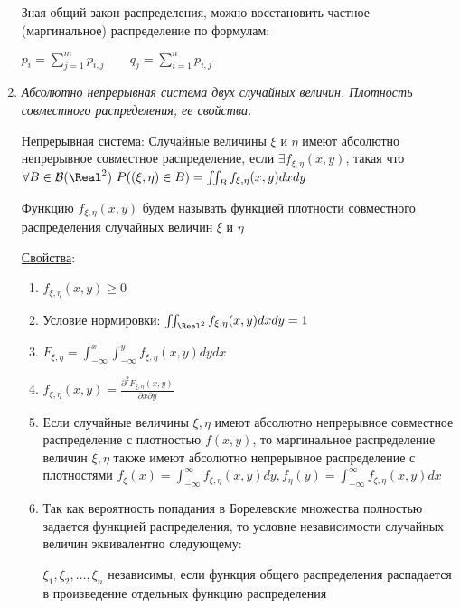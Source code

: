 \begin{enumerate}
    Зная общий закон распределения, можно восстановить частное (маргинальное) распределение по формулам: 

    $p_i = \sum_{j = 1}^m p_{i, j} \qquad q_j = \sum_{i = 1}^n p_{i, j}$

    \item \textit{Абсолютно непрерывная система двух случайных величин. Плотность совместного распределения, ее свойства.}
    
    \hyperlink{continuoussystemoftwovariables}{Непрерывная система}: Случайные величины $\xi$ и $\eta$ имеют абсолютно непрерывное совместное распределение, если
    $\exists f_{\xi, \eta}(x, y)$, такая что $\forall B \in \mathcal{B}(\Real^2) \ P((\xi, \eta) \in B) = \iint_B f_{\xi, \eta}(x, y) dxdy$

    Функцию $f_{\xi, \eta}(x, y)$ будем называть функцией плотности совместного распределения случайных величин $\xi$ и $\eta$

    \hyperlink{densityfunctionpropertiesincontinuoussystem}{Свойства}: 

    
    \begin{enumerate}
        \item $f_{\xi, \eta}(x, y) \geq 0$
        \item Условие нормировки: $\iint_{\Real^2} f_{\xi, \eta}(x, y) dxdy = 1$
        \item $F_{\xi, \eta} = \int_{-\infty}^x \int_{-\infty}^y f_{\xi, \eta}(x, y) dydx$

        \item $f_{\xi, \eta}(x, y) = \frac{\partial^2 F_{\xi, \eta}(x, y)}{\partial x \partial y}$
        
        \item Если случайные величины $\xi, \eta$ имеют абсолютно непрерывное совместное распределение с плотностью $f(x, y)$, 
        то маргинальное распределение величин $\xi, \eta$ также имеют абсолютно непрерывное распределение
        с плотностями $f_\xi(x) = \int_{-\infty}^\infty f_{\xi, \eta}(x, y) dy, f_\eta(y) = \int_{-\infty}^\infty f_{\xi, \eta}(x, y) dx$

        \item Так как вероятность попадания в Борелевские множества полностью задается функцией распределения, 
        то условие независимости случайных величин эквивалентно следующему:

        $\xi_1, \xi_2, \dots, \xi_n$ независимы, если функция общего распределения распадается в произведение 
        отдельных функцию распределения
    

\end{enumerate}
\end{enumerate}
